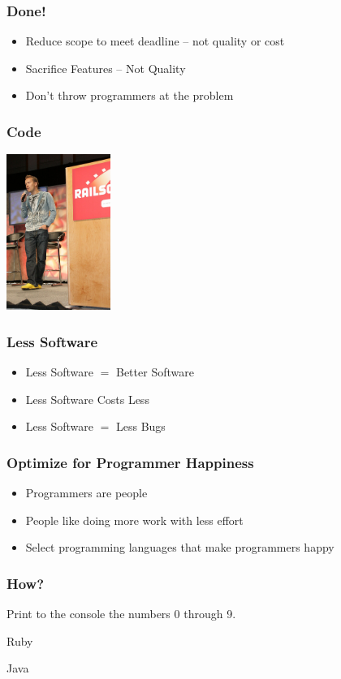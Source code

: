 \documentclass[10pt]{beamer}
\begin{document}
\begin{frame}
  \frametitle{Done!}
  \pause
  \begin{itemize}
    \item Reduce scope to meet deadline -- not quality or cost
    \pause
    \item Sacrifice Features -- Not Quality
    \pause
    \item Don't throw programmers at the problem
  \end{itemize}
\end{frame}
\begin{frame}
  \frametitle{Code}
  \includegraphics[height=2in]{dhh-railsconf}
\end{frame}
\begin{frame}
  \frametitle{Less Software}
  \begin{itemize}
  \item Less Software $=$ Better Software
    \pause
  \item Less Software Costs Less
    \pause
  \item Less Software $=$ Less Bugs
  \end{itemize}
\end{frame}
\begin{frame}
  \frametitle{Optimize for Programmer Happiness}
  \pause
  \begin{itemize}
    \item Programmers are people
    \pause
    \item People like doing more work with less effort
    \pause
    \item Select programming languages that make programmers happy
  \end{itemize}
\end{frame}
\begin{frame}
  \frametitle{How?}
  Print to the console the numbers 0 through 9.
  \begin{block}{Ruby}
    
  \end{block}
  \begin{block}{Java}
    
  \end{block}
\end{frame}
\end{document}
